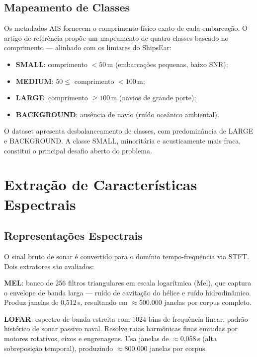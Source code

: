 \documentclass[a4paper,12pt]{article}
\begin{document}
\subsection{Mapeamento de Classes}

Os metadados AIS fornecem o comprimento físico exato de cada embarcação. O artigo de referência propõe um mapeamento de quatro classes baseado no comprimento — alinhado com os limiares do ShipsEar:
\begin{itemize}
    \item \textbf{SMALL}: comprimento $< 50$\,m (embarcações pequenas, baixo SNR);
    \item \textbf{MEDIUM}: $50 \leq$ comprimento $< 100$\,m;
    \item \textbf{LARGE}: comprimento $\geq 100$\,m (navios de grande porte);
    \item \textbf{BACKGROUND}: ausência de navio (ruído oceânico ambiental).
\end{itemize}

O dataset apresenta desbalanceamento de classes, com predominância de LARGE e BACKGROUND. A classe SMALL, minoritária e acusticamente mais fraca, constitui o principal desafio aberto do problema.

\section{Extração de Características Espectrais}

\subsection{Representações Espectrais}

O sinal bruto de sonar é convertido para o domínio tempo-frequência via STFT. Dois extratores são avaliados:

\textbf{MEL}: banco de 256 filtros triangulares em escala logarítmica (Mel), que captura o envelope de banda larga — ruído de cavitação do hélice e ruído hidrodinâmico. Produz janelas de 0,512\,s, resultando em $\approx$500.000 janelas por corpus completo.

\textbf{LOFAR}: espectro de banda estreita com 1024 bins de frequência linear, padrão histórico de sonar passivo naval. Resolve raias harmônicas finas emitidas por motores rotativos, eixos e engrenagens. Usa janelas de $\approx$0,058\,s (alta sobreposição temporal), produzindo $\approx$800.000 janelas por corpus.
\end{document}
